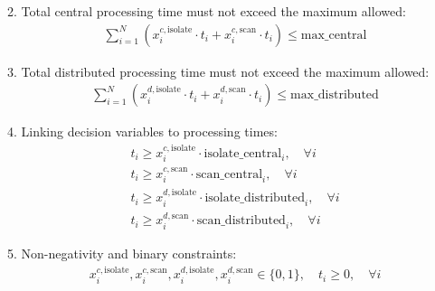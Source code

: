 \documentclass{article}
\begin{document}
2. Total central processing time must not exceed the maximum allowed:
\begin{align*}
    \sum_{i=1}^{N} \left( x_{i}^{c, \text{isolate}} \cdot t_{i} + x_{i}^{c, \text{scan}} \cdot t_{i} \right) \leq \text{max\_central}
\end{align*}

3. Total distributed processing time must not exceed the maximum allowed:
\begin{align*}
    \sum_{i=1}^{N} \left( x_{i}^{d, \text{isolate}} \cdot t_{i} + x_{i}^{d, \text{scan}} \cdot t_{i} \right) \leq \text{max\_distributed}
\end{align*}

4. Linking decision variables to processing times:
\begin{align*}
    t_{i} \geq x_{i}^{c, \text{isolate}} \cdot \text{isolate\_central}_{i}, \quad \forall i \\
    t_{i} \geq x_{i}^{c, \text{scan}} \cdot \text{scan\_central}_{i}, \quad \forall i \\
    t_{i} \geq x_{i}^{d, \text{isolate}} \cdot \text{isolate\_distributed}_{i}, \quad \forall i \\
    t_{i} \geq x_{i}^{d, \text{scan}} \cdot \text{scan\_distributed}_{i}, \quad \forall i
\end{align*}

5. Non-negativity and binary constraints:
\begin{align*}
    x_{i}^{c, \text{isolate}}, x_{i}^{c, \text{scan}}, x_{i}^{d, \text{isolate}}, x_{i}^{d, \text{scan}} \in \{0, 1\}, \quad t_{i} \geq 0, \quad \forall i
\end{align*}
\end{document}

